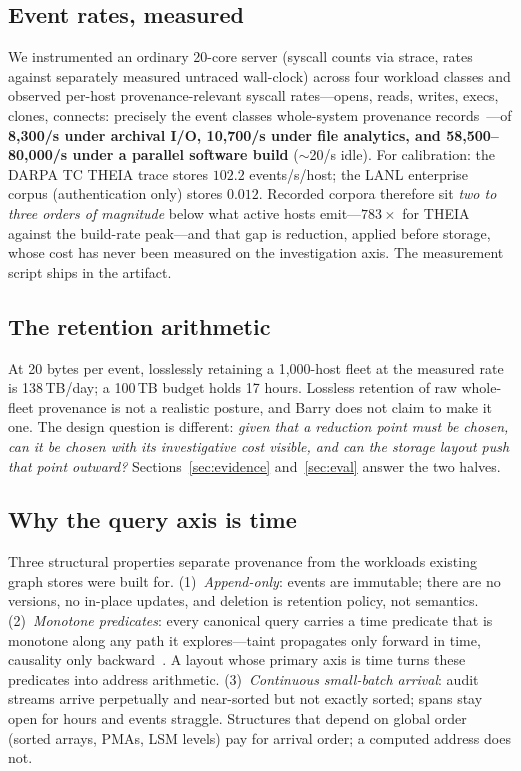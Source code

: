 \documentclass[11pt,letterpaper,twocolumn]{article}
\begin{document}
\subsection{Event rates, measured}
We instrumented an ordinary 20-core server (syscall counts via strace,
rates against separately measured untraced wall-clock) across four
workload classes and observed per-host provenance-relevant syscall
rates---opens, reads, writes, execs, clones, connects: precisely the
event classes whole-system provenance
records~\cite{pasquier2017camflow}---of \textbf{8{,}300/s under
archival I/O, 10{,}700/s under file analytics, and 58{,}500--80{,}000/s
under a parallel software build} ($\sim$20/s idle). For calibration:
the DARPA TC THEIA trace stores $102.2$ events/s/host; the LANL
enterprise corpus (authentication only) stores $0.012$. Recorded
corpora therefore sit \emph{two to three orders of magnitude} below
what active hosts emit---$783\times$ for THEIA against the build-rate
peak---and that gap is reduction, applied before storage, whose cost
has never been measured on the investigation axis. The measurement
script ships in the artifact.

\subsection{The retention arithmetic}
At 20 bytes per event, losslessly retaining a 1{,}000-host fleet at
the measured rate is 138\,TB/day; a 100\,TB budget holds 17 hours.
Lossless retention of raw whole-fleet provenance is not a realistic
posture, and Barry does not claim to make it one. The design question
is different: \emph{given that a reduction point must be chosen, can
it be chosen with its investigative cost visible, and can the storage
layout push that point outward?} Sections~\ref{sec:evidence}
and~\ref{sec:eval} answer the two halves.

\subsection{Why the query axis is time}
Three structural properties separate provenance from the workloads
existing graph stores were built for. (1)~\emph{Append-only}: events
are immutable; there are no versions, no in-place updates, and
deletion is retention policy, not semantics. (2)~\emph{Monotone
predicates}: every canonical query carries a time predicate that is
monotone along any path it explores---taint propagates only forward in
time, causality only backward~\cite{king2003backtracker}. A layout
whose primary axis is time turns these predicates into address
arithmetic. (3)~\emph{Continuous small-batch arrival}: audit streams
arrive perpetually and near-sorted but not exactly sorted; spans stay
open for hours and events straggle. Structures that depend on global
order (sorted arrays, PMAs, LSM levels) pay for arrival order; a
computed address does not.
\end{document}
